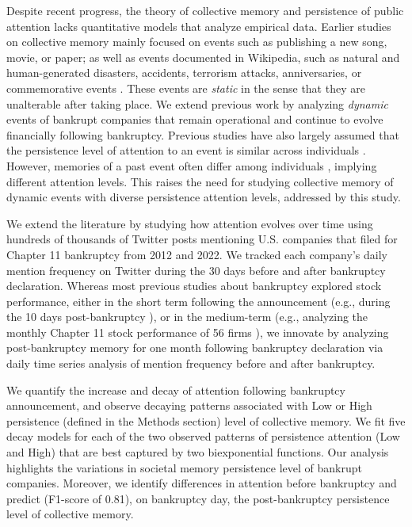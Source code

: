 \documentclass[9pt,twocolumn,twoside,lineno]{pnas-new}
\begin{document}
Despite recent progress, the theory of collective memory and persistence of public attention lacks quantitative models that analyze empirical data.
Earlier studies on collective memory mainly focused on events such as publishing a new song, movie, or paper; as well as events documented in Wikipedia, such as natural and human-generated disasters, accidents, terrorism attacks, anniversaries, or commemorative events \cite{yu2016pantheon, candia2019universal, west2021postmortem, jara2019medium, higham2017fame,garcia2017memory}.
These events are \textit{static} in the sense that they are unalterable after taking place.
We extend previous work by analyzing \textit{dynamic} events of bankrupt companies that remain operational and continue to evolve financially following bankruptcy.
Previous studies have also largely assumed that the persistence level of attention to an event is similar across individuals \cite{candia2019universal, igarashi2022two, west2021postmortem}.
However, memories of a past event often differ among individuals \cite{mena2016forgetting}, implying different attention levels.
This raises the need for studying collective memory of dynamic events with diverse persistence attention levels, addressed by this study.

We extend the literature by studying how attention evolves over time using hundreds of thousands of Twitter posts mentioning U.S. companies that filed for Chapter 11 bankruptcy from 2012 and 2022. 
We tracked each company's daily mention frequency on Twitter during the 30 days before and after bankruptcy declaration.
Whereas most previous studies about bankruptcy explored stock performance, either in the short term following the announcement (e.g., during the 10 days post-bankruptcy \cite{dawkins2007systematic}), or in the medium-term (e.g., analyzing the monthly Chapter 11 stock performance of 56 firms \cite{morse1988investing}), we innovate by analyzing post-bankruptcy memory for one month following bankruptcy declaration via daily time series analysis of mention frequency before and after bankruptcy.

We quantify the increase and decay of attention following bankruptcy announcement, and observe decaying patterns associated with Low or High persistence (defined in the Methods section) level of collective memory.
We fit five decay models for each of the two observed patterns of persistence attention (Low and High) that are best captured by two biexponential functions.
Our analysis highlights the variations in societal memory persistence level of bankrupt companies.
Moreover, we identify differences in attention before bankruptcy and predict (F1-score of 0.81), on bankruptcy day, the post-bankruptcy persistence level of collective memory.
\end{document}
